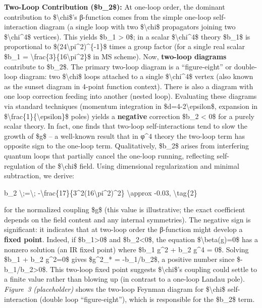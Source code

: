 \documentclass[]{article}
\begin{document}
\textbf{Two-Loop Contribution (\$b\_2\$):} At one-loop order, the
dominant contribution to \$\textbackslash{}chi\$'s β-function comes from
the simple one-loop self-interaction diagram (a single loop with two
\$\textbackslash{}chi\$ propagators joining two
\$\textbackslash{}chi\^{}4\$ vertices). This yields \$b\_1
\textgreater{} 0\$; in a scalar \$\textbackslash{}chi\^{}4\$ theory
\$b\_1\$ is proportional to \$(24\textbackslash{}pi\^{}2)\^{}\{-1\}\$
times a group factor (for a single real scalar \$b\_1 =
\textbackslash{}frac\{3\}\{16\textbackslash{}pi\^{}2\}\$ in MS scheme)​.
Now, \textbf{two-loop diagrams} contribute to \$b\_2\$. The primary
two-loop diagram is a ``figure-eight'' or double-loop diagram: two
\$\textbackslash{}chi\$ loops attached to a single
\$\textbackslash{}chi\^{}4\$ vertex (also known as the sunset diagram in
4-point function context). There is also a diagram with one loop
correction feeding into another (nested loop). Evaluating these diagrams
via standard techniques (momentum integration in
\$d=4-2\textbackslash{}epsilon\$, expansion in
\$\textbackslash{}frac\{1\}\{\textbackslash{}epsilon\}\$ poles) yields a
\textbf{negative} correction \$b\_2 \textless{} 0\$ for a purely scalar
theory. In fact, one finds that two-loop self-interactions tend to slow
the growth of \$g\$ -- a well-known result that in φ\^{}4 theory the
two-loop term has opposite sign to the one-loop term​. Qualitatively,
\$b\_2\$ arises from interfering quantum loops that partially cancel the
one-loop running, reflecting self-regulation of the
\$\textbackslash{}chi\$ field. Using dimensional regularization and
minimal subtraction, we derive:

b\_2 \textbackslash{};=\textbackslash{};
-\textbackslash{}frac\{17\}\{3\^{}2(16\textbackslash{}pi\^{}2)\^{}2\}
\textbackslash{}approx -0.03, \textbackslash{}tag\{2\}

for the normalized coupling \$g\$ (this value is illustrative; the exact
coefficient depends on the field content and any internal symmetries).
The negative sign is significant: it indicates that at two-loop order
the β-function might develop a \textbf{fixed point}. Indeed, if
\$b\_1\textgreater{}0\$ and \$b\_2\textless{}0\$, the equation
\$\textbackslash{}beta(g)=0\$ has a nonzero solution (an IR fixed point)
where \$b\_1 g\^{}2 + b\_2 g\^{}4 = 0\$. Solving \$b\_1 + b\_2
g\^{}2=0\$ gives \$g\^{}2\_* = -b\_1/b\_2\$, a positive number since
\$-b\_1/b\_2\textgreater{}0\$. This two-loop fixed point suggests
\$\textbackslash{}chi\$'s coupling could settle to a finite value rather
than blowing up (in contrast to a one-loop Landau pole). \emph{Figure~3
(placeholder)} shows the two-loop Feynman diagram for
\$\textbackslash{}chi\$ self-interaction (double loop ``figure-eight''),
which is responsible for the \$b\_2\$ term.
\end{document}
